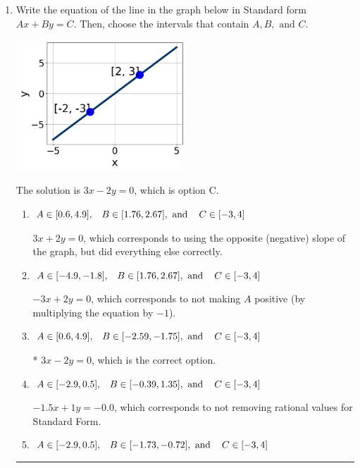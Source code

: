 \documentclass{extbook}[14pt]
\newcommand{\litem}[1]{\item #1

\rule{\textwidth}{0.4pt}}
\begin{document}
\begin{enumerate}\litem{
Write the equation of the line in the graph below in Standard form $Ax+By=C$. Then, choose the intervals that contain $A, B, \text{ and } C$.

\begin{center}
    \includegraphics[width=0.5\textwidth]{../Figures/linearGraphToStandardA.png}
\end{center}


The solution is \( 3x - 2y = 0 \), which is option C.\begin{enumerate}[label=\Alph*.]
\item \( A \in [0.6, 4.9], \hspace{3mm} B \in [1.76, 2.67], \text{ and } \hspace{3mm} C \in [-3, 4] \)

 $3x + 2y = 0$, which corresponds to using the opposite (negative) slope of the graph, but did everything else correctly.
\item \( A \in [-4.9, -1.8], \hspace{3mm} B \in [1.76, 2.67], \text{ and } \hspace{3mm} C \in [-3, 4] \)

 $-3x + 2y = 0$, which corresponds to not making $A$ positive (by multiplying the equation by $-1$).
\item \( A \in [0.6, 4.9], \hspace{3mm} B \in [-2.59, -1.75], \text{ and } \hspace{3mm} C \in [-3, 4] \)

* $3x - 2y = 0$, which is the correct option.
\item \( A \in [-2.9, 0.5], \hspace{3mm} B \in [-0.39, 1.35], \text{ and } \hspace{3mm} C \in [-3, 4] \)

 $-1.5x + 1y = -0.0$, which corresponds to not removing rational values for Standard Form.
\item \( A \in [-2.9, 0.5], \hspace{3mm} B \in [-1.73, -0.72], \text{ and } \hspace{3mm} C \in [-3, 4] \)


\end{enumerate}}
\end{enumerate}
\end{document}
